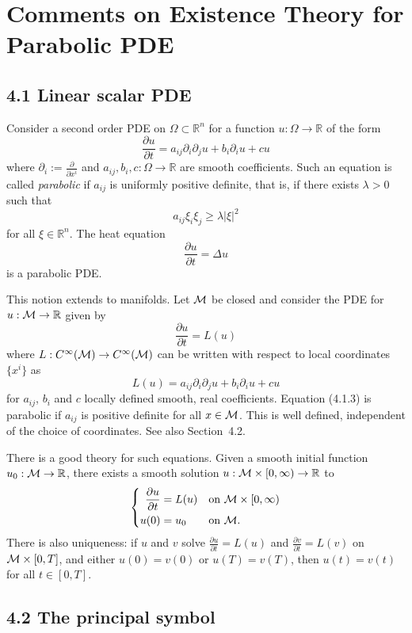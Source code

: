 \chapter{Comments on Existence Theory for Parabolic PDE}

\section*{4.1 \quad Linear scalar PDE}

Consider a second order PDE on $\Omega \subset \mathbb R^n$ for a function
$u : \Omega \to \mathbb R$ of the form
\[
\frac{\partial u}{\partial t}
= a_{ij} \partial_i \partial_j u + b_i \partial_i u + cu
\tag{4.1.1}
\]
where $\partial_i := \frac{\partial}{\partial x^i}$ and $a_{ij}, b_i, c :
\Omega \to \mathbb R$ are smooth coefficients. Such an equation is called
\emph{parabolic} if $a_{ij}$ is uniformly positive definite, that is, if there
exists $\lambda > 0$ such that
\[
a_{ij}\xi_i\xi_j \ge \lambda\lvert \xi\rvert^2
\tag{4.1.2}
\]
for all $\xi \in \mathbb R^n$. The heat equation
\[
\frac{\partial u}{\partial t} = \Delta u
\]
is a parabolic PDE.

This notion extends to manifolds. Let $\mathcal{M}$ be closed and consider the PDE for
$u : \mathcal{M} \to \mathbb R$ given by
\[
\frac{\partial u}{\partial t} = L(u)
\tag{4.1.3}
\]
where $L : C^\infty(\mathcal{M}) \to C^\infty(\mathcal{M})$ can be written with respect to local
coordinates $\{x^i\}$ as
\[
L(u) = a_{ij}\partial_i\partial_j u + b_i\partial_i u + cu
\]
for $a_{ij}$, $b_i$ and $c$ locally defined smooth, real coefficients. Equation
(4.1.3) is parabolic if $a_{ij}$ is positive definite for all $x \in \mathcal{M}$.
This is well defined, independent of the choice of coordinates. See also
Section~4.2.

There is a good theory for such equations. Given a smooth initial function
$u_0 : \mathcal{M} \to \mathbb R$, there exists a smooth solution $u : \mathcal{M} \times
[0,\infty) \to \mathbb R$ to
\[
\left\{
\begin{aligned}
\frac{\partial u}{\partial t} &= L(u) && \text{on } \mathcal{M} \times [0,\infty) \\
u(0) &= u_0 && \text{on } \mathcal{M}.
\end{aligned}
\right.
\]
There is also uniqueness: if $u$ and $v$ solve $\frac{\partial u}{\partial t}
= L(u)$ and $\frac{\partial v}{\partial t} = L(v)$ on $\mathcal{M} \times [0,T]$, and
either $u(0)=v(0)$ or $u(T)=v(T)$, then $u(t)=v(t)$ for all $t\in[0,T]$.

\section*{4.2 \quad The principal symbol}

